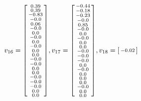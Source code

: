 \documentclass[a4paper,hidelinks,14pt]{extarticle}
\begin{document}
	$$
	v_{16}=\begin{bsmallmatrix}
		     0.39\\   
		0.39\\    
		-0.83\\    
		-0.0\\      
		0.06\\   
		-0.0\\      
		0.0\\      
		-0.0\\  
		0.0\\     
		-0.0\\     
		0.0\\    
		0.0\\      
		-0.0\\    
		-0.0\\    
		0.0\\     
		0.0\\   
		-0.0\\   
		-0.0\\      
		-0.0\\ 
		0.0\\    
		0.0\\  
	\end{bsmallmatrix},
	v_{17}=\begin{bsmallmatrix}
		     -0.44\\  
		-0.18\\   
		-0.23\\   
		-0.0\\      
		0.85\\   
		-0.0\\      
		0.0\\       
		-0.0\\  
		0.0\\      
		0.0\\      
		-0.0\\    
		-0.0\\      
		-0.0\\    
		0.0\\     
		-0.0\\     
		0.0\\    
		0.0\\    
		0.0\\       
		-0.0\\ 
		0.0\\     
		0.0\\   
	\end{bsmallmatrix},
	v_{18}=\begin{bsmallmatrix}
		         -0.02\\ 

\end{bsmallmatrix}$$
\end{document}
